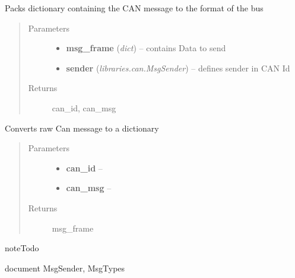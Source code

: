 \documentclass[letterpaper,10pt,english]{sphinxmanual}
\begin{document}
\begin{fulllineitems}
\label{libraries:libraries.can._pack}
Packs dictionary containing the CAN message to the format of the bus
\begin{quote}\begin{description}
\item[{Parameters}] \leavevmode\begin{itemize}
\item {} 
\textbf{msg\_frame} (\emph{dict}) -- contains Data to send

\item {} 
\textbf{sender} (\emph{libraries.can.MsgSender}) -- defines sender in CAN Id

\end{itemize}

\item[{Returns}] \leavevmode
can\_id, can\_msg

\end{description}\end{quote}

\end{fulllineitems}


\begin{fulllineitems}
\label{libraries:libraries.can._unpack}
Converts raw Can message to a dictionary
\begin{quote}\begin{description}
\item[{Parameters}] \leavevmode\begin{itemize}
\item {} 
\textbf{can\_id} -- 

\item {} 
\textbf{can\_msg} -- 

\end{itemize}

\item[{Returns}] \leavevmode
msg\_frame

\end{description}\end{quote}

\end{fulllineitems}


\begin{notice}{note}{Todo}

document MsgSender, MsgTypes
\end{notice}
\end{document}

